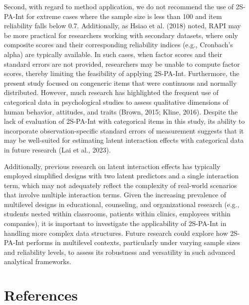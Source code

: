 \documentclass[
  man]{apa6}
\begin{document}
Second, with regard to method application, we do not recommend the use of 2S-PA-Int for extreme cases where the sample size is less than 100 and item reliability falls below 0.7. Additionally, as Hsiao et al. (2018) noted, RAPI may be more practical for researchers working with secondary datasets, where only composite scores and their corresponding reliability indices (e.g., Cronbach's alpha) are typically available. In such cases, when factor scores and their standard errors are not provided, researchers may be unable to compute factor scores, thereby limiting the feasibility of applying 2S-PA-Int. Furthermore, the present study focused on congeneric items that were continuous and normally distributed. However, much research has highlighted the frequent use of categorical data in psychological studies to assess qualitative dimensions of human behavior, attitudes, and traits (Brown, 2015; Kline, 2016). Despite the lack of evaluation of 2S-PA-Int with categorical items in this study, its ability to incorporate observation-specific standard errors of measurement suggests that it may be well-suited for estimating latent interaction effects with categorical data in future research (Lai et al., 2023).

Additionally, previous research on latent interaction effects has typically employed simplified designs with two latent predictors and a single interaction term, which may not adequately reflect the complexity of real-world scenarios that involve multiple interaction terms. Given the increasing prevalence of multilevel designs in educational, counseling, and organizational research (e.g., students nested within classrooms, patients within clinics, employees within companies), it is important to investigate the applicability of 2S-PA-Int in handling more complex data structures. Future research could explore how 2S-PA-Int performs in multilevel contexts, particularly under varying sample sizes and reliability levels, to assess its robustness and versatility in such advanced analytical frameworks.

\newpage

\section{References}\label{references}
\end{document}
